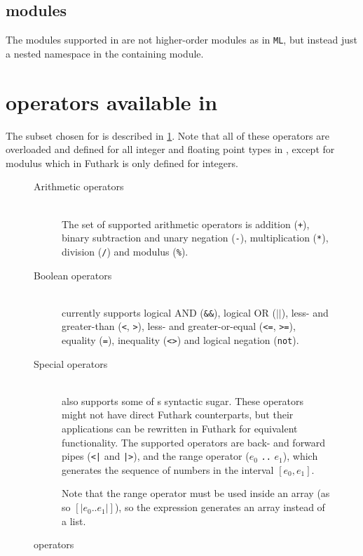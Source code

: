 \subsection{\fshark{} modules}
\label{noteonfsharkmodules}
The modules supported in \fshark{} are not higher-order modules as in
\texttt{ML}, but instead just a nested namespace in the containing module.

\section{\fsharp{} operators available in \fshark{}}
The \fsharp{} subset chosen for \fshark{} is described in \ref{fig:fsharkops}.
Note that all of these operators are overloaded and defined for all integer
and floating point types in \fsharp{}, except for modulus which in Futhark is
only defined for integers.

\begin{figure}[h]
  \centering
\begin{description}
\item[Arithmetic operators]\hfill\\
  The set of supported arithmetic operators is addition (\texttt{+}),
  binary subtraction and unary negation (\texttt{-}), multiplication
  (\texttt{*}), division (\texttt{/}) and modulus (\texttt{\%}).

\item[Boolean operators]\hfill\\
  \fshark{} currently supports logical AND (\texttt{\&\&}), logical OR
  (\texttt{$||$}), less- and greater-than (\texttt{<}, \texttt{>}), less- and
  greater-or-equal (\texttt{<=}, \texttt{>=}), equality (\texttt{=}),
  inequality (\texttt{<>}) and logical negation (\texttt{not}).

\item[Special operators]\hfill\\
  \fshark{} also supports some of \fsharp{}s syntactic sugar. These operators
  might not have direct Futhark counterparts, but their applications can be
  rewritten in Futhark for equivalent functionality.
  The supported operators are back- and forward pipes (\texttt{<|} and
  \texttt{|>}), and the range operator ($e_0$ \texttt{..} $e_1$), which
  generates the sequence of numbers in the interval $[e_0,e_1]$.

  Note that the range operator must be used inside an array (as so
  \texttt{$[\vert e_0..e_1\vert]$}), so the expression generates an array
  instead of a list.
\end{description}
  \caption{\fshark{} operators}
\label{fig:fsharkops}
\end{figure}



